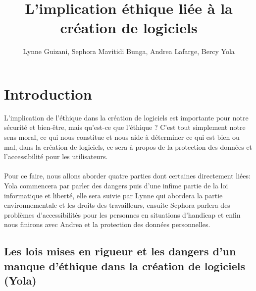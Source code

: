 \documentclass{article}
\title{L'implication éthique liée à la création de logiciels}
\author{Lynne Guizani, Sephora Mavitidi Bunga, Andrea Lafarge, Bercy Yola}
\begin{document}
\maketitle

\section{Introduction}
L'implication de l'éthique dans la création de logiciels est importante pour notre sécurité et bien-être, mais qu'est-ce que l'éthique ? C'est tout simplement notre sens moral, ce qui nous constitue et nous aide à déterminer ce qui est bien ou mal, dans la création de logiciels, ce sera à propos de la protection des données et l'accessibilité pour les utilisateurs.
\\\\
Pour ce faire, nous allons aborder quatre parties dont certaines directement liées:
Yola commencera par parler des dangers puis d'une infime partie de la loi informatique et liberté, elle sera suivie par Lynne qui abordera la partie environnementale et les droits des travailleurs, ensuite Sephora parlera des problèmes d'accessibilités pour les personnes en situations d'handicap et enfin nous finirons avec Andrea et la protection des données personnelles. 


\subsection{Les lois mises en rigueur et les dangers d'un manque d'éthique dans la création de logiciels (Yola)}
\end{document}
